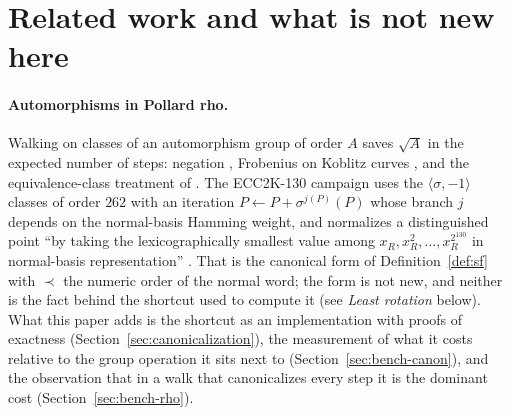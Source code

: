 \section{Related work and what is not new here}
\label{sec:related}

\paragraph{Automorphisms in Pollard rho.}
Walking on classes of an automorphism group of order $A$ saves
$\sqrt A$ in the expected number of steps: negation
\citep{wienerzuccherato1998}, Frobenius on Koblitz curves
\citep{wienerzuccherato1998,glv2000,glv2001}, and the equivalence-class
treatment of \citet{duursma1999}. The ECC2K-130 campaign
\citep{bailey2009,bos2010,bernstein2010} uses the $\langle\sigma,-1\rangle$
classes of order $262$ with an iteration $P\leftarrow P+\sigma^{j(P)}(P)$
whose branch $j$ depends on the normal-basis Hamming weight, and
normalizes a distinguished point ``by taking the lexicographically
smallest value among $x_R,x_R^2,\dots,x_R^{2^{130}}$ in normal-basis
representation'' \citep{bailey2009}. That is the canonical form of
Definition~\ref{def:sf} with $\prec$ the numeric order of the normal
word; the form is not new, and neither is the fact behind the
shortcut used to compute it (see \emph{Least rotation} below). What
this paper adds is the shortcut as an implementation with proofs of
exactness (Section~\ref{sec:canonicalization}), the measurement of
what it costs relative to the group operation it sits next to
(Section~\ref{sec:bench-canon}), and the observation that in a walk
that canonicalizes every step it is the dominant cost
(Section~\ref{sec:bench-rho}).


